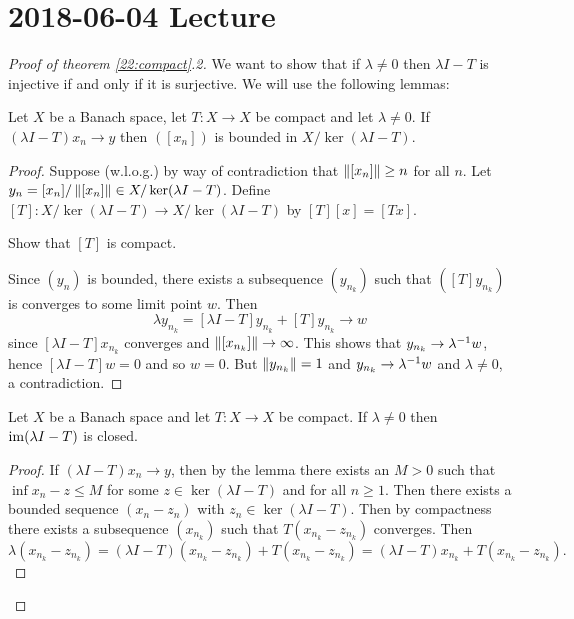 \section{2018-06-04 Lecture}

\begin{proof}[Proof of theorem \ref{22:compact}.2]
  We want to show that if $\lambda \neq 0$ then $\lambda I-T$ is injective if and only if it is surjective.
  We will use the following lemmas:

  \begin{lem}
    Let $X$ be a Banach space, let $T: X \to X$ be compact and let $\lambda \neq 0$.
    If $(\lambda I-T)x_n \to y$ then $([x_n])$ is bounded in $X/\ker(\lambda I-T)$.
  \end{lem}

  \begin{proof}
    Suppose (w.l.o.g.) by way of contradiction that $\left\lVert [x_n] \right\rVert \geq n$ for all $n$.
    Let $y_n = [x_n]/\left\lVert [x_n] \right\rVert \in X/\ker(\lambda I-T)$.
    Define $[T] : X/\ker(\lambda I-T) \to X/\ker(\lambda I-T)$ by $[T][x]=[Tx]$.

    \begin{exer}
      Show that $[T]$ is compact.
    \end{exer}

    Since $(y_n)$ is bounded, there exists a subsequence $(y_{n_k})$ such that $([T]y_{n_k})$ is converges to some limit point $w$.
    Then
    \[ \lambda y_{n_k} = [\lambda I-T]y_{n_k} + [T]y_{n_k} \to w \]
    since $[\lambda I-T]x_{n_k}$ converges and $\left\lVert [x_{n_k}] \right\rVert \to \infty$.
    This shows that $y_{n_k} \to \lambda^{-1} w$, hence $[\lambda I-T]w=0$ and so $w=0$.
    But $\left\lVert y_{n_k} \right\rVert=1$ and $y_{n_k} \to \lambda^{-1} w$ and $\lambda \neq 0$, a contradiction.
  \end{proof}

  \begin{cor}
    Let $X$ be a Banach space and let $T: X \to X$ be compact.
    If $\lambda \neq 0$ then $\operatorname{im}(\lambda I-T)$ is closed.
  \end{cor}

  \begin{proof}
    If $(\lambda I-T)x_n \to y$, then by the lemma there exists an $M>0$ such that $\inf{x_n-z} \leq M$ for some $z \in \ker(\lambda I-T)$ and for all $n \geq 1$.
    Then there exists a bounded sequence $(x_n-z_n)$ with $z_n \in \ker(\lambda I-T)$.
    Then by compactness there exists a subsequence $(x_{n_k})$ such that $T(x_{n_k}-z_{n_k})$ converges.
    Then
    \[ \lambda (x_{n_k}-z_{n_k}) = (\lambda I-T)(x_{n_k}-z_{n_k}) + T(x_{n_k}-z_{n_k}) = (\lambda I-T)x_{n_k} + T(x_{n_k}-z_{n_k}). \]
  \end{proof}


\end{proof}
